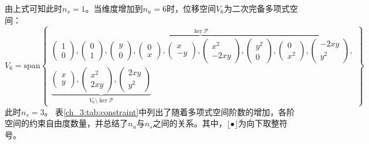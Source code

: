 由上式可知此时$n_s=1$。当维度增加到$n_u=6$时，位移空间$V_6$为二次完备多项式空间：
\begin{equation}\label{ch_3:eq:base2}
    V_6 = \mathrm{span}
    \begin{Bmatrix}
        \overbrace{
        \begin{pmatrix} 1 \\ 0 \end{pmatrix},
        \begin{pmatrix} 0 \\ 1 \end{pmatrix},
        \begin{pmatrix} y \\ 0 \end{pmatrix},
        \begin{pmatrix} 0 \\ x \end{pmatrix},
        \begin{pmatrix} x \\ -y \end{pmatrix},
        \begin{pmatrix} x^2 \\ -2xy \end{pmatrix},
        \begin{pmatrix} y^2 \\ 0 \end{pmatrix},
        \begin{pmatrix} 0 \\ x^2 \end{pmatrix},
        \begin{pmatrix} -2xy \\ y^2 \end{pmatrix}
        }^{\ker \mathcal P}, \\
        \underbrace{
        \begin{pmatrix} x \\ y \end{pmatrix},
        \begin{pmatrix} x^2 \\ 2xy \end{pmatrix},
        \begin{pmatrix} 2xy \\ y^2 \end{pmatrix}
        }_{V_6\setminus \ker \mathcal P}
    \end{Bmatrix}
\end{equation}
此时$n_s=3$。
表\ref{ch_3:tab:constraint}中列出了随着多项式空间阶数的增加，各阶空间的约束自由度数量，并总结了$n_u$与$n_s$之间的关系。其中，$\lfloor\bullet \rfloor$为向下取整符号。
